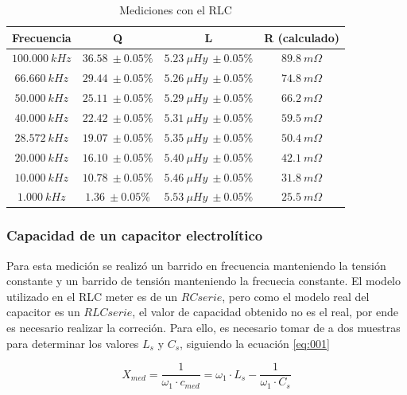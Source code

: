 \documentclass[a4paper,10pt]{article}
\begin{document}
		\begin{table}[!htp]
			\centering
			\begin{tabular}{|c|c|c|c|}
				\hline
				Frecuencia & Q & L  & R (calculado) \\
				\hline
				$100.000~kHz$& $36.58~\pm0.05\%$ & $5.23~\mu Hy~\pm0.05\%$ &
				$ 89.8~m\Omega$ \\
				\hline
				$66.660~kHz$& $29.44~\pm0.05\%$ & $5.26~\mu Hy~\pm0.05\%$ &
				$ 74.8~m\Omega$ \\
				\hline
				$50.000~kHz$& $25.11~\pm0.05\%$ & $5.29~\mu Hy~\pm0.05\%$ &
				$ 66.2~m\Omega$ \\
				\hline  
				$40.000~kHz$& $22.42~\pm0.05\%$ & $5.31~\mu Hy~\pm0.05\%$ &
				$ 59.5~m\Omega$ \\
				\hline  										
				$28.572~kHz$& $19.07~\pm0.05\%$ & $5.35~\mu Hy~\pm0.05\%$ &
				$ 50.4~m\Omega$ \\
				\hline
				$20.000~kHz$& $16.10~\pm0.05\%$ & $5.40~\mu Hy~\pm0.05\%$ &
				$ 42.1~m\Omega$ \\
				\hline  
				$10.000~kHz$& $10.78~\pm0.05\%$ & $5.46~\mu Hy~\pm0.05\%$ &
				$ 31.8~m\Omega$ \\
				\hline 										
				$1.000~kHz$& $1.36~\pm0.05\%$ & $5.53~\mu Hy~\pm0.05\%$ &
				$ 25.5~m\Omega$ \\
				\hline 	  
			\end{tabular}
			\caption{Mediciones con el RLC} \label{tabRLCbobina}
		\end{table}
				
		\subsubsection{Capacidad de un capacitor electrol\'itico}	
		\indent Para esta medición se realizó un barrido en frecuencia 
		manteniendo la tensión constante y un barrido de tensión manteniendo la
		frecuecia constante. El modelo utilizado en el RLC meter es de un $RC 
		serie$, pero como el modelo real del capacitor es un $RLC serie$, el 
		valor de capacidad obtenido no es el real, por ende es necesario 
		realizar la correción. Para ello, es necesario tomar de a dos muestras
		para determinar los valores $L_s$ y $C_s$, siguiendo la ecuación 
		\ref{eq:001}
		
		\begin{equation}\label{eq:001}
			X_{med} = \frac{1}{\omega_1\cdot c_{med}} = \omega_1\cdot L_s - 
			\frac{1}{\omega_1\cdot C_s}
		\end{equation}
		
\end{document}

